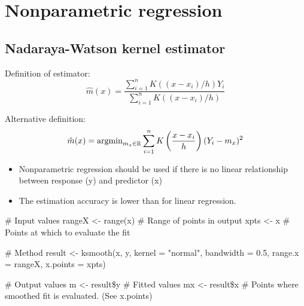 \section{Nonparametric regression}
\subsection{Nadaraya-Watson kernel estimator}
\begin{theory}
 Definition of estimator:
 \begin{equation}
 \hat{m}(x) = \frac{\sum_{i=1}^n K((x-x_i)/h) Y_i}{\sum_{i=1}^n K((x-x_i)/h)}
 \end{equation}
 
 Alternative definition:
 \begin{equation}
 \hat{m}(x) = \operatorname{arg min}_{m_x \in \mathbb{R}} \sum_{i=1}^n K \left( \frac{x-x_i}{h} \right) (Y_i - m_x)^2
 \end{equation}
\end{theory}

\begin{application}
\begin{itemize}
 \item[\leftthumbsup] Nonparametric regression should be used if there is no linear relationship between response (y) and predictor (x)
 \item[\leftthumbsdown] The estimation accuracy is lower than for linear regression.
\end{itemize}
\end{application}

\begin{code}
 # Input values
 rangeX <- range(x) # Range of points in output
 xpts <- x # Points at which to evaluate the fit
 
 # Method
 result <- ksmooth(x, y, kernel = "normal", bandwidth = 0.5, range.x = rangeX, x.points = xpts)
 
 # Output values
 m <- result\$y # Fitted values
 mx <- result\$x # Points where smoothed fit is evaluated. (See x.points)
\end{code}

